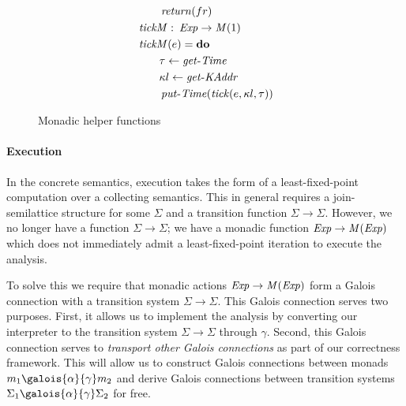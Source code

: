 \begin{figure}
\begin{align*}
&\hspace{2em}  \operatorname{\mathit{return}}( fr) \\
&\hspace{0em}  \operatorname{\mathit{tickM}}   \mathbin{\colon}   \operatorname{\mathit{Exp}}   \rightarrow   \operatorname{\mathit{M}}( 1) \\
&\hspace{0em}  \operatorname{\mathit{tickM}}( e) =  \operatorname{\mathtt{\boldsymbol{\mathbf{do}}}}  \\
&\hspace{2em}  \tau   \leftarrow   \operatorname{\mathit{get-Time}}  \\
&\hspace{2em}  \kappa l  \leftarrow   \operatorname{\mathit{get-KAddr}}  \\
&\hspace{2em}  \operatorname{\mathit{put-Time}}(  \operatorname{\mathit{tick}}( e, \kappa l, \tau ))
\end{align*}\normalsize

\caption{Monadic helper functions}
\label{InterpreterHelpers}

\end{figure}

\par

\paragraph{Execution}

In the concrete semantics, execution takes the form of a
least-fixed-point computation over a collecting semantics. This in
general requires a join-semilattice structure for some $ \Sigma $ and a
transition function $ \Sigma   \rightarrow   \Sigma $. However, we no
longer have a function $ \Sigma   \rightarrow   \Sigma $; we have a
monadic function $ \operatorname{\mathit{Exp}}   \rightarrow   \operatorname{\mathit{M}}  (\operatorname{\mathit{Exp}}) $
which does not immediately admit a least-fixed-point iteration to
execute the analysis.

\par

To solve this we require that monadic actions
$ \operatorname{\mathit{Exp}}   \rightarrow   \operatorname{\mathit{M}}  (\operatorname{\mathit{Exp}}) $ form a Galois
connection with a transition system $ \Sigma   \rightarrow   \Sigma $.
This Galois connection serves two purposes. First, it allows us to
implement the analysis by converting our interpreter to the transition
system $ \Sigma   \rightarrow   \Sigma $ through $ \gamma $. Second,
this Galois connection serves to \emph{transport other Galois
connections} as part of our correctness framework. This will allow us to
construct Galois connections between monads
$m _1   \galois{\alpha}{\gamma}  m _2 $ and derive Galois connections
between transition systems
$ \Sigma  _1   \galois{\alpha}{\gamma}   \Sigma  _2 $ for free.

